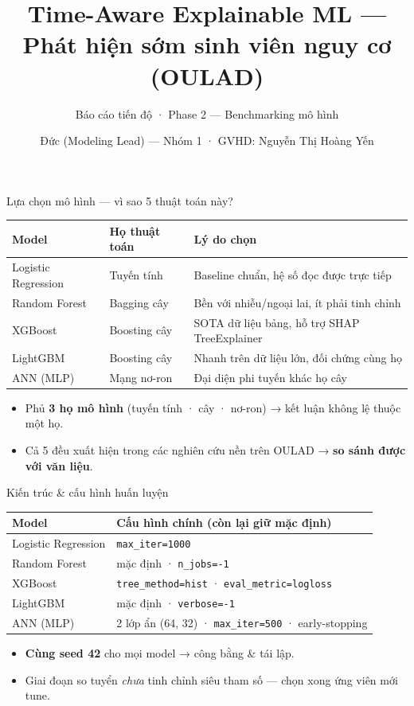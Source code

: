 \documentclass[aspectratio=169,11pt]{beamer}
\title{Time-Aware Explainable ML —\\Phát hiện sớm sinh viên nguy cơ (OULAD)}
\subtitle{Báo cáo tiến độ · Phase 2 — Benchmarking mô hình}
\author{Đức (Modeling Lead) — Nhóm 1 · GVHD: Nguyễn Thị Hoàng Yến}
\institute{Đại học FPT · DSP391m}
\date{}
\begin{document}
\begin{frame}\titlepage\end{frame}

\begin{frame}{Lựa chọn mô hình — vì sao 5 thuật toán này?}
\small
\begin{tabular}{@{}lll@{}}
\toprule
\textbf{Model} & \textbf{Họ thuật toán} & \textbf{Lý do chọn} \\
\midrule
Logistic Regression & Tuyến tính & Baseline chuẩn, hệ số đọc được trực tiếp \\
Random Forest & Bagging cây & Bền với nhiễu/ngoại lai, ít phải tinh chỉnh \\
XGBoost & Boosting cây & SOTA dữ liệu bảng, hỗ trợ SHAP TreeExplainer \\
LightGBM & Boosting cây & Nhanh trên dữ liệu lớn, đối chứng cùng họ \\
ANN (MLP) & Mạng nơ-ron & Đại diện phi tuyến khác họ cây \\
\bottomrule
\end{tabular}
\vspace{4mm}
\begin{itemize}
  \item Phủ \textbf{3 họ mô hình} (tuyến tính · cây · nơ-ron) → kết luận không lệ thuộc một họ.
  \item Cả 5 đều xuất hiện trong các nghiên cứu nền trên OULAD → \textbf{so sánh được với văn liệu}.
\end{itemize}
\end{frame}

\begin{frame}{Kiến trúc \& cấu hình huấn luyện}
\small
\begin{tabular}{@{}ll@{}}
\toprule
\textbf{Model} & \textbf{Cấu hình chính (còn lại giữ mặc định)} \\
\midrule
Logistic Regression & \texttt{max\_iter=1000} \\
Random Forest & mặc định · \texttt{n\_jobs=-1} \\
XGBoost & \texttt{tree\_method=hist} · \texttt{eval\_metric=logloss} \\
LightGBM & mặc định · \texttt{verbose=-1} \\
ANN (MLP) & 2 lớp ẩn (64, 32) · \texttt{max\_iter=500} · early-stopping \\
\bottomrule
\end{tabular}
\vspace{4mm}
\begin{itemize}
  \item \textbf{Cùng seed 42} cho mọi model → công bằng \& tái lập.
  \item Giai đoạn so tuyển \emph{chưa} tinh chỉnh siêu tham số — chọn xong ứng viên mới tune.
\end{itemize}
\end{frame}
\end{document}

